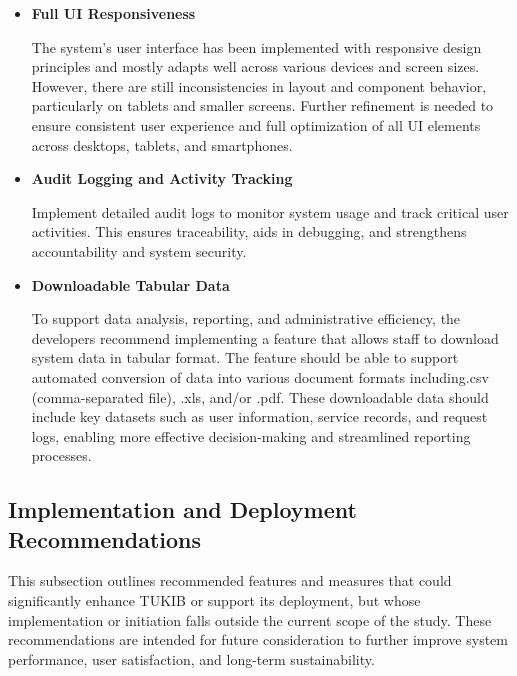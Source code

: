 \begin{itemize}
	\item \textbf{Full UI Responsiveness}
	
	The system’s user interface has been implemented with responsive design principles and mostly adapts well across various devices and screen sizes. However, there are still inconsistencies in layout and component behavior, particularly on tablets and smaller screens. Further refinement is needed to ensure consistent user experience and full optimization of all UI elements across desktops, tablets, and smartphones.

	\item \textbf{Audit Logging and Activity Tracking}
	
	Implement detailed audit logs to monitor system usage and track critical user activities. This ensures traceability, aids in debugging, and strengthens accountability and system security.
	
	\item \textbf{Downloadable Tabular Data}
	
	To support data analysis, reporting, and administrative efficiency, the developers recommend implementing a feature that allows staff to download system data in tabular format. The feature should be able to support automated conversion of data into various document formats including.csv (comma-separated file), .xls,	and/or .pdf. These downloadable data should include key datasets such as user information, service records, and request logs, enabling more effective decision-making and streamlined reporting processes.
	
\end{itemize}

\subsection{Implementation and Deployment Recommendations}

This subsection outlines recommended features and measures that could significantly enhance TUKIB or support its deployment, but whose implementation or initiation falls outside the current scope of the study. These recommendations are intended for future consideration to further improve system performance, user satisfaction, and long-term sustainability.

